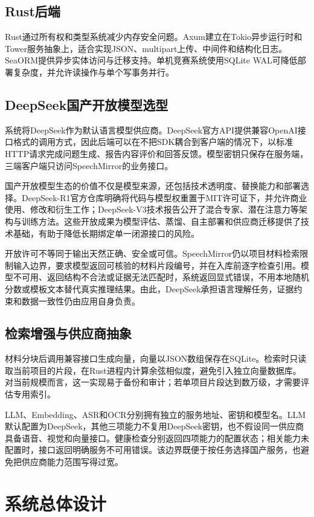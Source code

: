 \section{Rust后端}
Rust通过所有权和类型系统减少内存安全问题\cite{rustbook}。Axum建立在Tokio异步运行时和Tower服务抽象上\cite{axum}，适合实现JSON、multipart上传、中间件和结构化日志。SeaORM提供异步实体访问与迁移支持\cite{seaorm}。单机竞赛系统使用SQLite WAL可降低部署复杂度，并允许读操作与单个写事务并行\cite{sqlitewal}。

\section{DeepSeek国产开放模型选型}
系统将DeepSeek作为默认语言模型供应商。DeepSeek官方API提供兼容OpenAI接口格式的调用方式\cite{deepseekapi}，因此后端可以在不把SDK耦合到客户端的情况下，以标准HTTP请求完成问题生成、报告内容评价和回答反馈。模型密钥只保存在服务端，三端客户端只访问SpeechMirror的业务接口。

国产开放模型生态的价值不仅是模型来源，还包括技术透明度、替换能力和部署选择。DeepSeek-R1官方仓库明确将代码与模型权重置于MIT许可证下，并允许商业使用、修改和衍生工作\cite{deepseekr1}；DeepSeek-V3技术报告公开了混合专家、潜在注意力等架构与训练方法\cite{deepseekv3}。这些开放成果为模型评估、蒸馏、自主部署和供应商迁移提供了技术基础，有助于降低长期绑定单一闭源接口的风险。

开放许可不等同于输出天然正确、安全或可信。SpeechMirror仍以项目材料检索限制输入边界，要求模型返回可核验的材料片段编号，并在入库前逐字检查引用。模型不可用、返回结构不合法或证据无法匹配时，系统返回显式错误，不用本地随机分数或模板文本替代真实推理结果。由此，DeepSeek承担语言理解任务，证据约束和数据一致性仍由应用自身负责。

\section{检索增强与供应商抽象}
材料分块后调用兼容接口生成向量，向量以JSON数组保存在SQLite。检索时只读取当前项目的片段，在Rust进程内计算余弦相似度，避免引入独立向量数据库。对当前规模而言，这一实现易于备份和审计；若单项目片段达到数万级，才需要评估专用索引。

LLM、Embedding、ASR和OCR分别拥有独立的服务地址、密钥和模型名。LLM默认配置为DeepSeek，其他三项能力不复用DeepSeek密钥，也不假设同一供应商具备语音、视觉和向量接口。健康检查分别返回四项能力的配置状态；相关能力未配置时，接口返回明确服务不可用错误。该边界既便于按任务选择国产服务，也避免把供应商能力范围写得过宽。

\chapter{系统总体设计}
